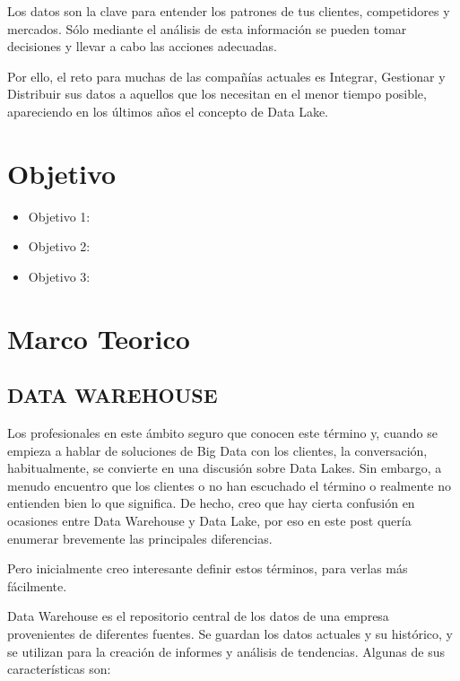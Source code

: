 \documentclass[preprint,12pt]{elsarticle}
\begin{document}
Los datos son la clave para entender los patrones de tus clientes, competidores y mercados. Sólo mediante el análisis de esta información se pueden tomar decisiones y llevar a cabo las acciones adecuadas.

Por ello, el reto para muchas de las compañías actuales es Integrar, Gestionar y Distribuir sus datos a aquellos que los necesitan en el menor tiempo posible, apareciendo en los últimos años el concepto de Data Lake.

	

\section{Objetivo}
		\begin{itemize}
		\item Objetivo 1:
		\item Objetivo 2: 
		\item Objetivo 3: 

	\end{itemize}

	

\section{Marco Teorico}
	
\subsection{DATA WAREHOUSE}	

Los profesionales en este ámbito seguro que conocen este término y, cuando se empieza a hablar de soluciones de Big Data con los clientes, la conversación, habitualmente, se convierte en una discusión sobre Data Lakes. Sin embargo, a menudo encuentro que los clientes o no han escuchado el término o realmente no entienden bien lo que significa. De hecho, creo que hay cierta confusión en ocasiones entre Data Warehouse y Data Lake, por eso en este post quería enumerar brevemente las principales diferencias.

Pero inicialmente creo interesante definir estos términos, para verlas más fácilmente.

Data Warehouse es el repositorio central de los datos de una empresa provenientes de diferentes fuentes. Se guardan los datos actuales y su histórico, y se utilizan para la creación de informes y análisis de tendencias. Algunas de sus características son:
\end{document}
